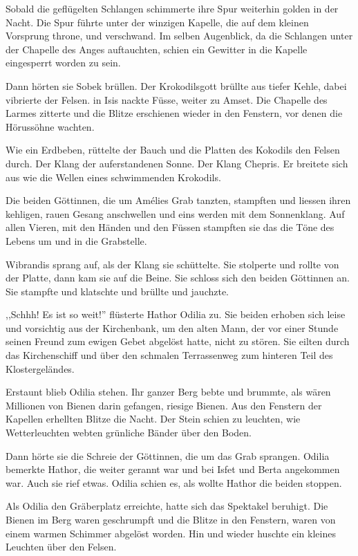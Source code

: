 Sobald die geflügelten Schlangen schimmerte ihre Spur weiterhin golden in der Nacht. Die Spur führte unter der winzigen Kapelle, die auf dem kleinen Vorsprung throne, und verschwand. Im selben Augenblick, da die Schlangen unter der Chapelle des Anges auftauchten, schien ein Gewitter in die Kapelle eingesperrt worden zu sein. 

Dann hörten sie Sobek brüllen. Der Krokodilsgott brüllte aus tiefer Kehle, dabei vibrierte der Felsen. in Isis nackte Füsse, weiter zu Amset. Die Chapelle des Larmes zitterte und die Blitze erschienen wieder in den Fenstern, vor denen die Hörussöhne wachten. 

Wie ein Erdbeben, rüttelte der Bauch und die Platten des Kokodils den Felsen durch. Der Klang der auferstandenen Sonne. Der Klang Chepris. Er breitete sich aus wie die Wellen eines schwimmenden Krokodils.

Die beiden Göttinnen, die um Amélies Grab tanzten, stampften und liessen ihren kehligen, rauen Gesang anschwellen und eins werden mit dem Sonnenklang. Auf allen Vieren, mit den Händen und den Füssen stampften sie das die Töne des Lebens um und in die Grabstelle.

Wibrandis sprang auf, als der Klang sie schüttelte. Sie stolperte und rollte von der Platte, dann kam sie auf die Beine. Sie schloss sich den beiden Göttinnen an. Sie stampfte und klatschte und brüllte und jauchzte. 

\sterne

,,Schhh! Es ist so weit!'' flüsterte Hathor Odilia zu. Sie beiden erhoben sich leise und vorsichtig aus der Kirchenbank, um den alten Mann, der vor einer Stunde seinen Freund zum ewigen Gebet abgelöst hatte, nicht zu stören.
 Sie eilten durch das Kirchenschiff und über den schmalen Terrassenweg zum hinteren Teil des Klostergeländes. 
 
Erstaunt blieb Odilia stehen. Ihr ganzer Berg bebte und brummte, als wären Millionen von Bienen darin gefangen, riesige Bienen. Aus den Fenstern der Kapellen erhellten Blitze die Nacht. Der Stein schien zu leuchten, wie Wetterleuchten webten grünliche Bänder über den Boden.

Dann hörte sie die Schreie der Göttinnen, die um das Grab sprangen. Odilia bemerkte Hathor, die weiter gerannt war und bei Isfet und Berta angekommen war. Auch sie rief etwas. Odilia schien es, als wollte Hathor die beiden stoppen.

Als Odilia den Gräberplatz erreichte, hatte sich das Spektakel beruhigt. Die Bienen im Berg waren geschrumpft und die Blitze in den Fenstern, waren von einem warmen Schimmer abgelöst worden. Hin und wieder huschte ein kleines Leuchten über den Felsen.

